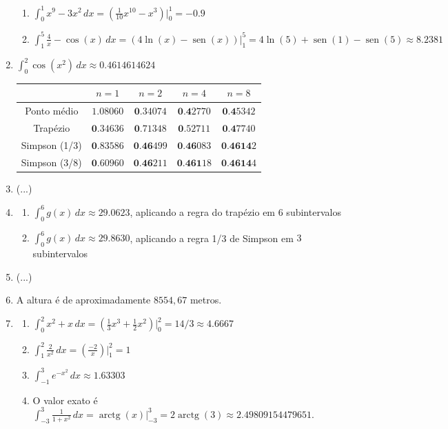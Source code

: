\documentclass[12pt,a4paper]{article}
\newcommand{\fixme}{{\color{red}(...)}}
\newcommand*\sen{\operatorname{sen}}
\newcommand*\arctg{\operatorname{arctg}}
\begin{document}
\begin{enumerate}
\begin{enumerate}
\item $\int_0^1 x^9 - 3x^2 \,dx= \left(\frac{1}{10}x^{10} - x^3\right) \Big|_0^1 = -0.9$
\item $\int_1^5 \frac{4}{x} - \cos(x) \,dx = \left( 4\ln(x) - \sen(x)\right) \Big|_1^5 = 4\ln(5) + \sen(1) - \sen(5) \approx 8.2381$
\end{enumerate}
\item $\int_0^2 \cos(x^2)\, dx \approx 0.4614614624$
\begin{center}
\begin{tabular}{|c|c|c|c|c|}
\hline
              & $n=1$     & $n=2$    & $n=4$   & $n=8$ \\ \hline
Ponto médio   & $1.08060$ & $\textbf{0}.34074$ & $\textbf{0.4}2770$ & $\textbf{0.4}5342$ \\ \hline
Trapézio      & $\textbf{0}.34636$ & $\textbf{0}.71348$ & $\textbf{0}.52711$ & $\textbf{0.4}7740$ \\ \hline
Simpson (1/3) & $\textbf{0}.83586$ & $\textbf{0.46}499$ & $\textbf{0.46}083$ & $\textbf{0.4614}2$ \\ \hline
Simpson (3/8) & $\textbf{0}.60960$ & $\textbf{0.46}211$ & $\textbf{0.461}18$ & $\textbf{0.4614}4$ \\ \hline
\end{tabular}
\end{center}
\item \fixme
\item
\begin{enumerate}
\item $\int_0^6 g(x)\,dx \approx 29.0623$, aplicando a regra do trapézio em $6$ subintervalos
\item $\int_0^6 g(x)\,dx \approx 29.8630$, aplicando a regra 1/3 de Simpson em $3$ subintervalos
\end{enumerate}
\item \fixme
\item A altura é de aproximadamente $8554,67$ metros.
\item
\begin{enumerate}
\item $\int_0^2 x^2 + x\,dx = \left( \frac{1}{3}x^3 +\frac{1}{2}x^2 \right)\Big|_0^2 = 14/3 \approx 4.6667$
\item $\int_1^2 \frac{2}{x^2}\,dx = \left( \frac{-2}{x} \right)\Big|_1^2 = 1$
\item $\int_{-1}^3 e^{-x^2}\,dx \approx 1.63303$
\item O valor exato é $\int_{-3}^3 \frac{1}{1+x^2} \,dx = \arctg(x) \Big|_{-3}^3 = 2 \arctg(3) \approx 2.49809154479651$.

\end{enumerate}
\end{enumerate}
\end{document}
